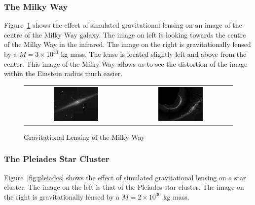 \documentclass[aspectratio=1610,xcolor=dvipsnames,t]{beamer}
\begin{document}
\subsubsection{The Milky Way}
Figure~\ref{fig:milky-way} shows the effect of simulated gravitational lensing
on an image of the centre of the Milky Way galaxy. 
The image on left is looking towards the centre of the Milky Way in the
infrared. The image on the right is gravitationally lensed by a 
$M = 3 \times 10^{30}$ kg mass. The lense is located slightly left and above
from the center. This image of the Milky Way allows us to see the distortion
of the image within the Einstein radius much easier.

\begin{figure}
    \caption{Gravitational Lensing of the Milky Way} 
    \label{fig:milky-way} 
    \begin{center}
        \begin{tabular}{cc}
            \includegraphics[width=0.45\textwidth]{Pics/milky.eps} &
            \includegraphics[width=0.45\textwidth]{Pics/milky3e30.eps} 
        \end{tabular}
    \end{center}
\end{figure}

\subsubsection{The Pleiades Star Cluster}
Figure~\ref{fig:pleiades} shows the effect of simulated gravitational lensing
on a star cluster. 
The image on the left is that of the Pleiades star cluster. The image
on the right is gravitationally lensed by a $M = 2 \times 10^{30}$ kg
mass.
\end{document}

